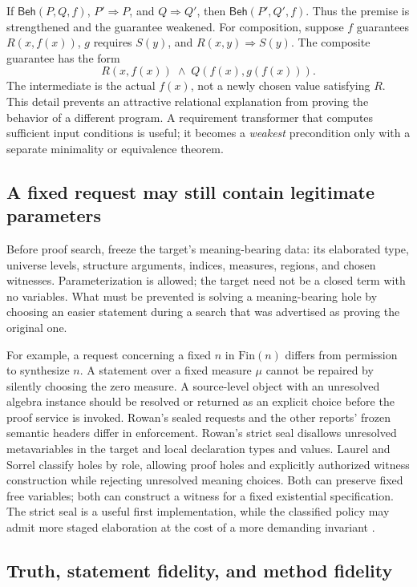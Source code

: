 \documentclass[11pt,letterpaper]{article}
\newcommand{\Beh}{\mathsf{Beh}}\newcommand{\Spec}{\mathsf{Spec}}
\theoremstyle{definition}\newtheorem{definition}[proposition]{Definition}
\theoremstyle{remark}\newtheorem{remark}[proposition]{Remark}
\begin{document}
If $\Beh(P,Q,f)$, $P'\Rightarrow P$, and $Q\Rightarrow Q'$, then
$\Beh(P',Q',f)$. Thus the premise is strengthened and the guarantee weakened.
For composition, suppose $f$ guarantees $R(x,f(x))$, $g$ requires $S(y)$,
and $R(x,y)\Rightarrow S(y)$. The composite guarantee has the form
\[
 R(x,f(x))\;\land\;Q(f(x),g(f(x))).
\]
The intermediate is the actual $f(x)$, not a newly chosen value satisfying
$R$. This detail prevents an attractive relational explanation from proving
the behavior of a different program. A requirement transformer that computes
sufficient input conditions is useful; it becomes a \emph{weakest}
precondition only with a separate minimality or equivalence theorem.

\subsection{A fixed request may still contain legitimate parameters}

Before proof search, freeze the target's meaning-bearing data: its elaborated
type, universe levels, structure arguments, indices, measures, regions, and
chosen witnesses. Parameterization is allowed; the target need not be a closed
term with no variables. What must be prevented is solving a meaning-bearing
hole by choosing an easier statement during a search that was advertised as
proving the original one.

For example, a request concerning a fixed $n$ in $\mathrm{Fin}(n)$ differs
from permission to synthesize $n$. A statement over a fixed measure $\mu$
cannot be repaired by silently choosing the zero measure. A source-level
object with an unresolved algebra instance should be resolved or returned
as an explicit choice before the proof service is invoked. Rowan's sealed
requests and the other reports' frozen semantic headers differ in enforcement.
Rowan's strict seal disallows unresolved metavariables in the target and local
declaration types and values. Laurel and Sorrel classify holes by role,
allowing proof holes and explicitly authorized witness construction while
rejecting unresolved meaning choices. Both can preserve fixed free variables;
both can construct a witness for a fixed existential specification. The strict
seal is a useful first implementation, while the classified policy may admit
more staged elaboration at the cost of a more demanding invariant
\cite{rowan,laurel,sorrel,heather}.

\subsection{Truth, statement fidelity, and method fidelity}
\end{document}
